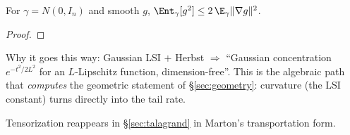\begin{theorem}\label{thm:gaussian-lsi}
For $\gamma=N(0,I_n)$ and smooth $g$, $\Ent_\gamma[g^2]\le 2\,\E_\gamma\|\nabla g\|^2$.
\end{theorem}
\begin{proof}\end{proof}

\begin{strand}
Why it goes this way: Gaussian LSI $+$ Herbst $\Rightarrow$ ``Gaussian concentration $e^{-t^2/2L^2}$ for an
$L$-Lipschitz function, dimension-free''. This is the algebraic path that \emph{computes} the geometric
statement of §\ref{sec:geometry}: curvature (the LSI constant) turns directly into the tail rate.
\end{strand}

%
\quad Tensorization reappears in §\ref{sec:talagrand} in Marton's transportation form.
